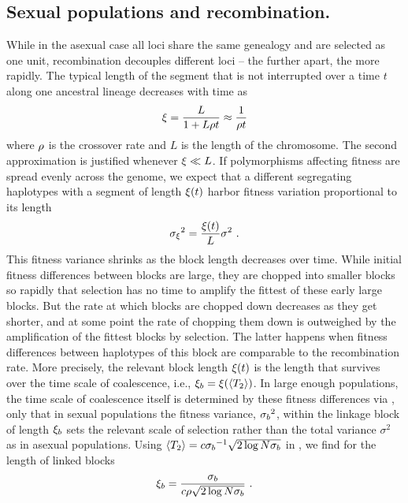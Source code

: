 \subsection*{Sexual populations and recombination.}
While in the asexual case all loci share the same genealogy and
are selected as one unit, recombination decouples different loci -- the
further apart, the more rapidly. The typical length of the segment that
is not interrupted over a time $t$ along one ancestral lineage decreases
with time as
\begin{equation}
  \label{eq:block_length}
  \block = \frac{L}{1+L\xo t} \approx \frac{1}{\xo t}
\end{equation}
where $\rho$ is the crossover rate and $L$ is the length of the chromosome.
The second approximation is justified whenever $\xi\ll L$. If polymorphisms
affecting fitness are spread evenly across the genome, we expect that
a different segregating haplotypes with a segment of length $\xi(t)$ 
harbor fitness variation proportional to its length 
\begin{equation}
  \label{eq:sigma_block}
  \sigblock^2 = \frac{\block(t)}{L}\sigma^2 \ .
\end{equation}
This fitness variance shrinks as the block length decreases over
time. While initial fitness differences between blocks are large, they
are chopped into smaller blocks so rapidly that selection has no time to
amplify the fittest of these early large blocks. But the rate at which
blocks are chopped down decreases as they get shorter, and at some point
the rate of chopping them down is outweighed by the amplification of the
fittest blocks by selection. The latter happens when fitness differences
between haplotypes of this block are comparable to the recombination rate.
More precisely, the relevant block length $\xi(t)$ is the
length that survives over the time scale of coalescence, i.e.,
${\xi_b}=\xi(\langle T_2\rangle)$. In large enough populations, the time scale of
coalescence itself is determined by these fitness differences via
, only that in sexual populations the 
fitness variance, ${\sigma_b}^2$,  within the linkage block of length ${\xi_b}$ sets the
relevant scale of selection rather than the total variance $\sigma^2$
as in asexual populations.  Using $\langle T_2\rangle = c{{\sigma_b}}^{-1}\sqrt{2\log
  N{\sigma_b}}$ in , we find for the length of linked
blocks 
\begin{equation}
  \label{eq:blockTc}
  \blockT = \frac{\sigblockT}{c\xo \sqrt{2\log N\sigblockT}} \ .
\end{equation}
